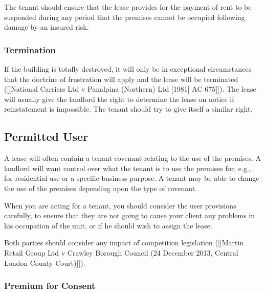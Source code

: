 \documentclass[
]{article}
\newenvironment{Shaded}{}{}
\newcommand{\NormalTok}[1]{#1}
\begin{document}
The tenant should ensure that the lease provides for the payment of rent
to be suspended during any period that the premises cannot be occupied
following damage by an insured risk.

\hypertarget{termination}{%
\subsubsection{Termination}\label{termination}}

If the building is totally destroyed, it will only be in exceptional
circumstances that the doctrine of frustration will apply and the lease
will be terminated ({[}{[}National Carriers Ltd v Panalpina (Northern)
Ltd {[}1981{]} AC 675{]}{]}). The lease will usually give the landlord
the right to determine the lease on notice if reinstatement is
impossible. The tenant should try to give itself a similar right.

\hypertarget{permitted-user}{%
\subsection{Permitted User}\label{permitted-user}}

A lease will often contain a tenant covenant relating to the use of the
premises. A landlord will want control over what the tenant is to use
the premises for, e.g., for residential use or a specific business
purpose. A tenant may be able to change the use of the premises
depending upon the type of covenant.

\begin{Shaded}
\begin{Highlighting}[]
\NormalTok{When you are acting for a tenant, you should consider the user provisions carefully, to ensure that they are not going to cause your client any problems in his occupation of the unit, or if he should wish to assign the lease.}
\end{Highlighting}
\end{Shaded}

Both parties should consider any impact of competition legislation
({[}{[}Martin Retail Group Ltd v Crawley Borough Council (24 December
2013, Central London County Court){]}{]}).

\hypertarget{premium-for-consent}{%
\subsubsection{Premium for Consent}\label{premium-for-consent}}
\end{document}
